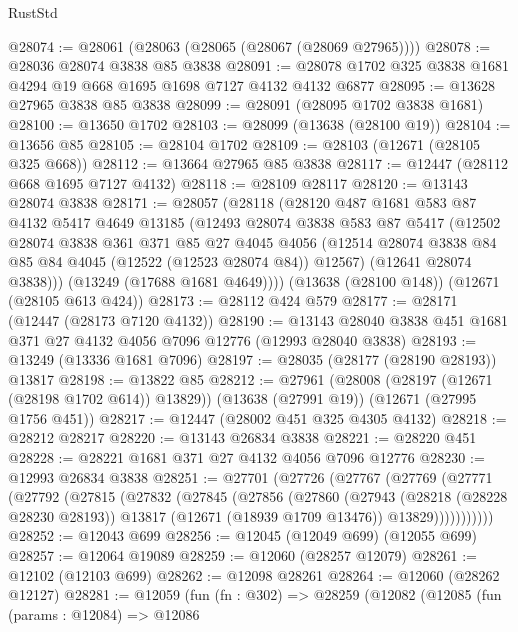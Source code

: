 \begin{lexlean}{RustStd}
\begin{coremodule}
@28074 := @28061 (@28063 (@28065 (@28067 (@28069 @27965))))
@28078 := @28036 @28074 @3838 @85 @3838
@28091 := @28078 @1702 @325 @3838 @1681 @4294 @19 @668 @1695 @1698 @7127 @4132 @4132 @6877
@28095 := @13628 @27965 @3838 @85 @3838
@28099 := @28091 (@28095 @1702 @3838 @1681)
@28100 := @13650 @1702
@28103 := @28099 (@13638 (@28100 @19))
@28104 := @13656 @85
@28105 := @28104 @1702
@28109 := @28103 (@12671 (@28105 @325 @668))
@28112 := @13664 @27965 @85 @3838
@28117 := @12447 (@28112 @668 @1695 @7127 @4132)
@28118 := @28109 @28117
@28120 := @13143 @28074 @3838
@28171 := @28057
    (@28118
      (@28120
        @487
        @1681
        @583
        @87
        @4132
        @5417
        @4649
        @13185
        (@12493
          @28074
          @3838
          @583
          @87
          @5417
          (@12502
            @28074
            @3838
            @361
            @371
            @85
            @27
            @4045
            @4056
            (@12514 @28074 @3838 @84 @85 @84 @4045 (@12522 (@12523 @28074 @84)) @12567)
            (@12641 @28074 @3838)))
        (@13249 (@17688 @1681 @4649))))
    (@13638 (@28100 @148))
    (@12671 (@28105 @613 @424))
@28173 := @28112 @424 @579
@28177 := @28171 (@12447 (@28173 @7120 @4132))
@28190 := @13143 @28040 @3838 @451 @1681 @371 @27 @4132 @4056 @7096 @12776 (@12993 @28040 @3838)
@28193 := @13249 (@13336 @1681 @7096)
@28197 := @28035 (@28177 (@28190 @28193)) @13817
@28198 := @13822 @85
@28212 := @27961
    (@28008 (@28197 (@12671 (@28198 @1702 @614)) @13829))
    (@13638 (@27991 @19))
    (@12671 (@27995 @1756 @451))
@28217 := @12447 (@28002 @451 @325 @4305 @4132)
@28218 := @28212 @28217
@28220 := @13143 @26834 @3838
@28221 := @28220 @451
@28228 := @28221 @1681 @371 @27 @4132 @4056 @7096 @12776
@28230 := @12993 @26834 @3838
@28251 := @27701
    (@27726
      (@27767
        (@27769
          (@27771
            (@27792
              (@27815
                (@27832
                  (@27845
                    (@27856
                      (@27860
                        (@27943
                          (@28218 (@28228 @28230 @28193))
                          @13817
                          (@12671 (@18939 @1709 @13476))
                          @13829)))))))))))
@28252 := @12043 @699
@28256 := @12045 (@12049 @699) (@12055 @699)
@28257 := @12064 @19089
@28259 := @12060 (@28257 @12079)
@28261 := @12102 (@12103 @699)
@28262 := @12098 @28261
@28264 := @12060 (@28262 @12127)
@28281 := @12059
    (fun (fn : @302) =>
    @28259
      (@12082
        (@12085
          (fun (params : @12084) =>
          @12086

\end{coremodule}
\end{lexlean}
